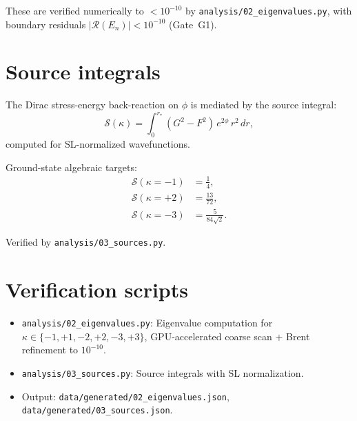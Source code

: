 \documentclass[11pt,letterpaper]{article}
\numberwithin{equation}{section}
\begin{document}
These are verified numerically to $< 10^{-10}$ by \texttt{analysis/02\_eigenvalues.py},
with boundary residuals $|\mathcal{R}(E_n)| < 10^{-10}$ (Gate~G1).

\section{Source integrals}
\label{sec:sources}

The Dirac stress-energy back-reaction on $\phi$ is mediated by the
source integral:
\begin{equation}
\label{eq:source}
  \mathcal{S}(\kappa) = \int_0^{r_*}\!\left(G^2 - F^2\right)\,e^{2\phi}\,r^2\,dr,
\end{equation}
computed for SL-normalized wavefunctions.

Ground-state algebraic targets:
\begin{align}
  \mathcal{S}(\kappa=-1) &= \frac{1}{4}, \\
  \mathcal{S}(\kappa=+2) &= \frac{13}{72}, \\
  \mathcal{S}(\kappa=-3) &= \frac{5}{84\sqrt{2}}.
\end{align}

Verified by \texttt{analysis/03\_sources.py}.

\section{Verification scripts}
\label{sec:verification}

\begin{itemize}
  \item \texttt{analysis/02\_eigenvalues.py}: Eigenvalue computation for
    $\kappa \in \{-1,+1,-2,+2,-3,+3\}$, GPU-accelerated coarse scan +
    Brent refinement to $10^{-10}$.
  \item \texttt{analysis/03\_sources.py}: Source integrals with SL normalization.
  \item Output: \texttt{data/generated/02\_eigenvalues.json},
    \texttt{data/generated/03\_sources.json}.
\end{itemize}
\end{document}
